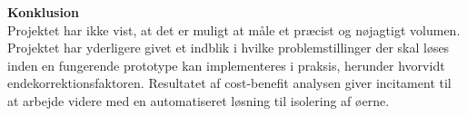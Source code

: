 \textbf{Konklusion} \\
 Projektet har ikke vist, at det er muligt at måle et præcist og nøjagtigt volumen. Projektet har yderligere givet
et indblik i hvilke problemstillinger der skal løses inden en fungerende prototype kan implementeres i praksis, herunder hvorvidt endekorrektionsfaktoren.
Resultatet af cost-benefit analysen giver incitament til at arbejde videre med en
automatiseret løsning til isolering af øerne.